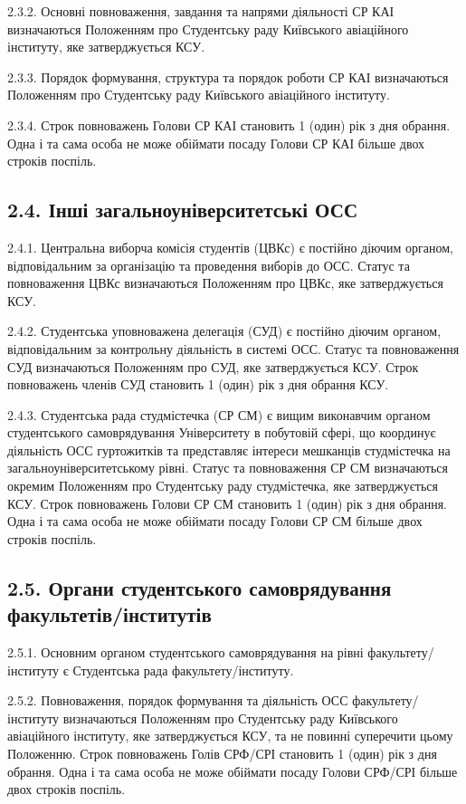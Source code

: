     2.3.2. Основні повноваження, завдання та напрями діяльності СР КАІ визначаються Положенням про Студентську раду Київського авіаційного інституту, яке затверджується КСУ.

    2.3.3. Порядок формування, структура та порядок роботи СР КАІ визначаються Положенням про Студентську раду Київського авіаційного інституту.

    2.3.4. Строк повноважень Голови СР КАІ становить 1 (один) рік з дня обрання. Одна і та сама особа не може обіймати посаду Голови СР КАІ більше двох строків поспіль.

\subsection*{2.4. Інші загальноуніверситетські ОСС}
    2.4.1. Центральна виборча комісія студентів (ЦВКс) є постійно діючим органом, відповідальним за організацію та проведення виборів до ОСС. Статус та повноваження ЦВКс визначаються Положенням про ЦВКс, яке затверджується КСУ.

    2.4.2. Студентська уповноважена делегація (СУД) є постійно діючим органом, відповідальним за контрольну діяльність в системі ОСС. Статус та повноваження СУД визначаються Положенням про СУД, яке затверджується КСУ. Строк повноважень членів СУД становить 1 (один) рік з дня обрання КСУ.

    2.4.3. Студентська рада студмістечка (СР СМ) є вищим виконавчим органом студентського самоврядування Університету в побутовій сфері, що координує діяльність ОСС гуртожитків та представляє інтереси мешканців студмістечка на загальноуніверситетському рівні. Статус та повноваження СР СМ визначаються окремим Положенням про Студентську раду студмістечка, яке затверджується КСУ. Строк повноважень Голови СР СМ становить 1 (один) рік з дня обрання. Одна і та сама особа не може обіймати посаду Голови СР СМ більше двох строків поспіль.

\subsection*{2.5. Органи студентського самоврядування факультетів/інститутів}
    2.5.1. Основним органом студентського самоврядування на рівні факультету/інституту є Студентська рада факультету/інституту.

    2.5.2. Повноваження, порядок формування та діяльність ОСС факультету/інституту визначаються Положенням про Студентську раду Київського авіаційного інституту, яке затверджується КСУ, та не повинні суперечити цьому Положенню. Строк повноважень Голів СРФ/СРІ становить 1 (один) рік з дня обрання. Одна і та сама особа не може обіймати посаду Голови СРФ/СРІ більше двох строків поспіль.


